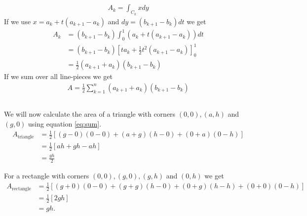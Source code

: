 \documentclass[a4paper,10pt,english]{article}
\begin{document}
\subsection{} \label{1c}
\begin{align}
    A_k = \int_{C_k} x dy
\end{align}
If we use $x = a_k + t (a_{k+1} - a_k)$ and $dy = ( b_{k+1} - b_k) dt$ we get
\begin{align*}
    A_k &= (b_{k+1} - b_k) \int_0^1 (a_k + t (a_{k+1} - a_k)) dt \\
    &= (b_{k+1} - b_k) \left[ ta_k + \frac{1}{2} t^2 (a_{k+1} - a_k) \right]_0^1 \\
    &= \frac{1}{2} (a_{k+1} + a_k)(b_{k+1} - b_k)
\end{align*}
If we sum over all line-pieces we get
\begin{align} \label{eq:sum}
    A = \frac{1}{2} \sum_{k=1}^{n} (a_{k+1} + a_k)(b_{k+1} - b_k) 
\end{align}

\subsection{} \label{1d}
We will now calculate the area of a triangle with corners $(0, 0), (a, h)$ and $(g, 0)$ using equation \ref{eq:sum}.
\begin{align*}
    A_{\text{triangle}} &= \frac{1}{2} [(g-0)(0-0) + (a+g)(h-0) + (0+a)(0-h)] \\
    &= \frac{1}{2} [ah + gh - ah] \\
    &= \frac{gh}{2}
\end{align*}

For a rectangle with corners $(0, 0), (g, 0), (g, h)$ and $(0, h)$ we get
\begin{align*}
    A_{\text{rectangle}} &= \frac{1}{2} [(g+0)(0-0) + (g+g)(h-0) + (0+g)(h-h) + (0+0)(0-h)] \\
    &= \frac{1}{2} [2gh] \\
    &= gh.
\end{align*}

\newpage

\section{} \label{2}
\end{document}
